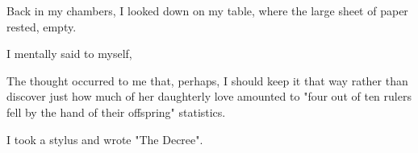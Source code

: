 
Back in my chambers, I looked down on my table, where the large sheet of paper rested, empty.

 I mentally said to myself, 

The thought occurred to me that, perhaps, I should keep it that way rather than discover just how much of her daughterly love amounted to "four out of ten rulers fell by the hand of their offspring" statistics.

I took a stylus and wrote "The Decree".

